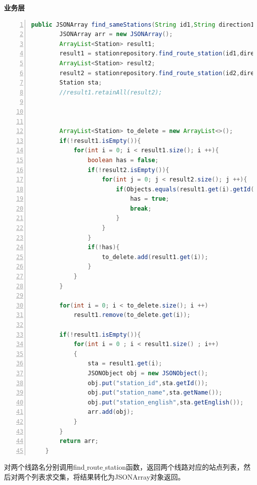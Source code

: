 \documentclass[11pt,a4paper]{article}
\begin{document}
\textbf{业务层} \\
\begin{lstlisting}[numbers = left, 
showstringspaces=false,
showspaces = false,
breaklines = true, 
language=Java]
    public JSONArray find_sameStations(String id1,String direction1,String id2,String direction2){
        JSONArray arr = new JSONArray();
        ArrayList<Station> result1;
        result1 = stationrepository.find_route_station(id1,direction1);
        ArrayList<Station> result2;
        result2 = stationrepository.find_route_station(id2,direction2);
        Station sta;
        //result1.retainAll(result2);



        ArrayList<Station> to_delete = new ArrayList<>();
        if(!result1.isEmpty()){
            for(int i = 0; i < result1.size(); i ++){
                boolean has = false;
                if(!result2.isEmpty()){
                    for(int j = 0; j < result2.size(); j ++){
                        if(Objects.equals(result1.get(i).getId(), result2.get(j).getId())){
                            has = true;
                            break;
                        }
                    }
                }
                if(!has){
                    to_delete.add(result1.get(i));
                }
            }
        }

        for(int i = 0; i < to_delete.size(); i ++)
            result1.remove(to_delete.get(i));

        if(!result1.isEmpty()){
            for(int i = 0 ; i < result1.size() ; i++)
            {
                sta = result1.get(i);
                JSONObject obj = new JSONObject();
                obj.put("station_id",sta.getId());
                obj.put("station_name",sta.getName());
                obj.put("station_english",sta.getEnglish());
                arr.add(obj);
            }
        }
        return arr;
    }
\end{lstlisting} 
对两个线路名分别调用find$\_$route$\_$station函数，返回两个线路对应的站点列表，然后对两个列表求交集，将结果转化为JSONArray对象返回。
\end{document}
